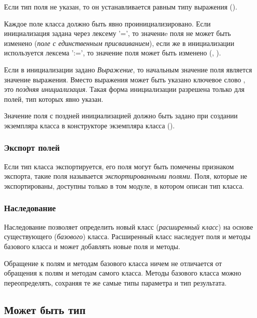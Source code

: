 Если тип поля не указан, то он устанавливается равным типу выражения ().

Каждое поле класса должно быть явно проинициализировано.
Если инициализация задана через лексему '=', то значениe поля не может быть изменено (\emph{поле с единственным присваиванием}), 
если же в инициализации используется лексема ':=', то значение поля может быть изменено  (, ).

Если в инициализации задано \emph{Выражение}, то начальным значение поля является значение выражения.
Вместо выражения может быть указано ключевое слово , это \emph{поздняя инициализация}. 
Такая форма инициализации разрешена только для полей, тип которых явно указан.

Значение поля с поздней инициализацией должно быть задано при создании экземпляра класса в конструкторе экземпляра класса (). 

\hypertarget{exported-fields}{%
\subsubsection{Экспорт полей}\label{decls:exported-fields}}

Если тип класса экспортируется, его поля могут быть помечены признаком экспорта, такие поля называется \emph{экспортированными полями}.
Поля, которые не экспортированы, доступны только в том модуле, в котором описан тип класса.

\hypertarget{inheritance}{%
\subsubsection{Наследование}\label{decls:inheritance}}

Наследование позволяет определить новый класс (\emph{расширенный класс}) на основе существующего (\emph{базового}) класса. 
Расширенный класс наследует поля и методы базового класса и может добавлять новые поля и методы.

Обращение к полям и методам базового класса ничем не отличается от обращения к полям и методам самого класса. 
Методы базового класса можно переопределять, сохраняя те же самые типы параметра и тип результата.

\hypertarget{mb-types}{%
\subsection{Может быть тип}\label{decls:mb-types}}

